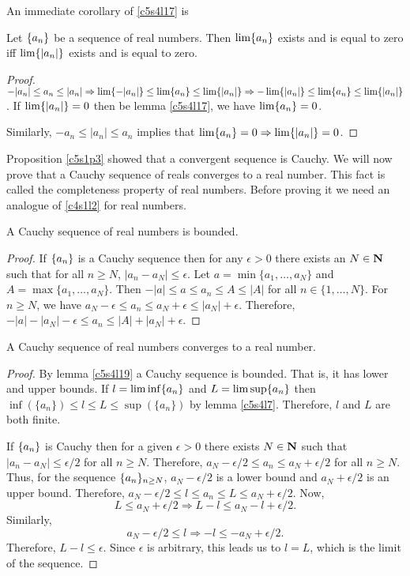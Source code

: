 An immediate corollary of \ref{c5s4l17} is
\begin{cor}\label{c5s4c1}
Let $\{a_n\}$ be a sequence of real numbers. Then $\lim\{a_n\}$ exists
and is equal to zero iff $\lim\{|a_n|\}$ exists and is equal to zero.
\end{cor}
\begin{proof}
$-|a_n| \le a_n \le |a_n| \Rightarrow \lim\{-|a_n|\} \le \lim\{a_n\} \le
\lim\{|a_n|\} \Rightarrow -\lim\{|a_n|\} \le \lim\{a_n\} \le \lim\{|a_n|\}$. If $\lim\{|a_n|\} = 0$ then be lemma \ref{c5s4l17}, we have $
\lim\{a_n\} = 0$.

Similarly, $-a_n \le |a_n| \le a_n$ implies that $\lim\{a_n\} = 0 
\Rightarrow \lim\{|a_n|\} = 0$.
\end{proof}

Proposition \ref{c5s1p3} showed that a convergent sequence is Cauchy. We
will now prove that a Cauchy sequence of reals converges to a real number.
This fact is called the completeness property of real numbers. Before
proving it we need an analogue of \ref{c4s1l2} for real numbers.
\begin{lem}\label{c5s4l19}
A Cauchy sequence of real numbers is bounded.
\end{lem}
\begin{proof}
If $\{a_n\}$ is a Cauchy sequence then for any $\epsilon > 0$ there exists
an $N \in \mathbf{N}$ such that for all $n \ge N$, $|a_n - a_N| \le \epsilon$. Let
$a = \min\{a_1, \ldots, a_N\}$ and $A = \max\{a_1, \ldots, a_N\}$. Then
$-|a| \le a \le a_n \le A \le |A|$ for all $n \in \{1, \ldots, N\}$. For 
$n \ge N$, we have $a_N - \epsilon \le a_n \le a_N + \epsilon \le |a_N| + 
\epsilon$. Therefore, $-|a| - |a_N| - \epsilon \le a_n \le |A| + |a_N| + 
\epsilon$.
\end{proof}

\begin{prop}\label{c5s4p2}
A Cauchy sequence of real numbers converges to a real number.
\end{prop}
\begin{proof}
By lemma \ref{c5s4l19} a Cauchy sequence is bounded. That is, it has lower 
and upper bounds. If $l = \liminf\{a_n\}$ and $L = \limsup\{a_n\}$
then $\inf(\{a_n\}) \le l \le L \le \sup(\{a_n\})$ by lemma \ref{c5s4l7}.
Therefore, $l$ and $L$ are both finite.

If $\{a_n\}$ is Cauchy then for a given $\epsilon > 0$ there exists $N \in
\mathbf{N}$ such that $|a_n - a_N| \le \epsilon/2$ for all $n \ge N$. Therefore,
$a_N - \epsilon/2 \le a_n \le a_N + \epsilon/2$ for all $n \ge N$. Thus, 
for the sequence $\{a_n\}_{n \ge N}$, $a_N - \epsilon/2$ is a lower bound 
and $a_N + \epsilon/2$ is an upper bound. Therefore, $a_N - \epsilon/2 \le l
\le a_n \le L \le a_N + \epsilon/2$. Now,
\[
L \le a_N + \epsilon/2 \Rightarrow L - l \le a_N - l + \epsilon/2.
\]
Similarly,
\[
a_N - \epsilon/2 \le l \Rightarrow -l \le -a_N + \epsilon/2.
\]
Therefore, $L - l \le \epsilon$. Since $\epsilon$ is arbitrary, this leads
us to $l = L$, which is the limit of the sequence.
\end{proof}

